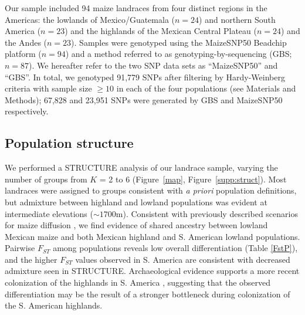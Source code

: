 Our sample included 94 maize landraces from four distinct regions in the Americas: the lowlands of Mexico/Guatemala ($n=24$) and northern South America ($n=23$) and the highlands of the Mexican Central Plateau ($n=24$) and the Andes ($n=23$). Samples were genotyped using the MaizeSNP50 Beadchip platform ($n=94$) and a method referred to as genotyping-by-sequencing (GBS; $n=87$). 
We hereafter refer to the two SNP data sets as ``MaizeSNP50'' and ``GBS''.
In total, we genotyped 91,779 SNPs after filtering by Hardy-Weinberg criteria with sample size $\geq10$ in each of the four populations (see Materials and Methods); 67,828  and 23,951 SNPs were generated by GBS and MaizeSNP50 respectively.  

\subsection*{Population structure}

We performed a {\sf STRUCTURE} analysis \cite[]{Pritchard_2000_10835412,Falush_2003_12930761} of our landrace sample, varying the number of groups from $K$ = 2 to 6 (Figure~\ref{map}, Figure~\ref{supp:struct}). 
Most landraces were assigned to groups consistent with \emph{a priori} population definitions, but admixture between highland and lowland populations was evident at intermediate elevations ($\sim1700$m).  Consistent with previously described scenarios for maize diffusion \cite[]{Piperno_2006_69}, we find evidence of shared ancestry between lowland Mexican maize and both Mexican highland and S. American lowland populations.  Pairwise $F_{ST}$ among populations reveals low overall differentiation (Table \ref{FstP}), and the higher $F_{ST}$ values observed in S. America are consistent with decreased admixture seen in STRUCTURE.  Archaeological evidence supports a more recent colonization of the highlands in S. America  \cite[]{Piperno_2006_69,Perry_2006_16511492,Grobman_2012_22307642}, suggesting that the observed differentiation may be the result of a stronger bottleneck during colonization of the S. American highlands. 

